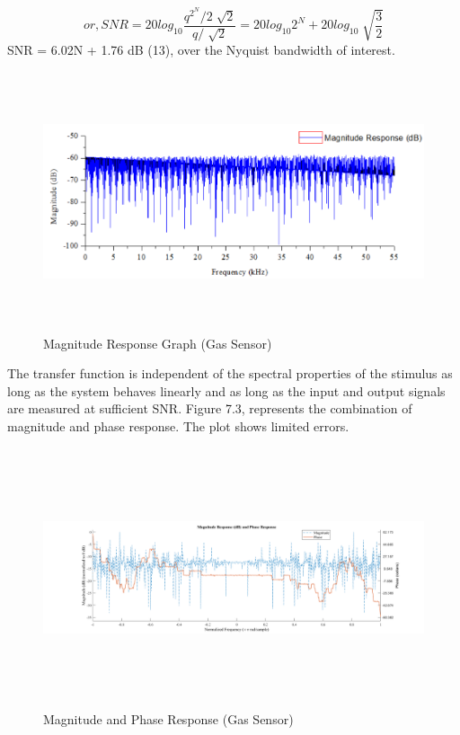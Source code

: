 \begin{equation}\tag{6.4}
or, SNR = 20log_{10}\frac{q^{2^{N}}/2\sqrt[]{2}}{q/\sqrt[]{2}}=20log_{10}2^{N}+20log_{10}\sqrt[]{\frac{3}{2}}
\end{equation}
SNR = 6.02N + 1.76 dB (13), over the Nyquist bandwidth of interest.
\begin{figure}[H]
	\begin{Center}
		\includegraphics[width=6.5in,height=3in]{16}
		\caption{ Magnitude Response Graph (Gas Sensor)}
		\label{fig:_2_Magnitude_Response_Graph_Gas_Sensor}
	\end{Center}
\end{figure}
The transfer function is independent of the spectral properties of the stimulus as long as the system behaves linearly and as long as the input and output signals are measured at sufficient SNR.
Figure 7.3, represents the combination of magnitude and phase response. The plot shows limited errors.
\begin{figure}[H]
	\begin{Center}
		\includegraphics[width=6.5in,height=3in]{17}
		\caption{ Magnitude and Phase Response (Gas Sensor) }
		\label{fig:_3_Magnitude_and_Phase_Response_Gas_Sensor_}
	\end{Center}
\end{figure}
